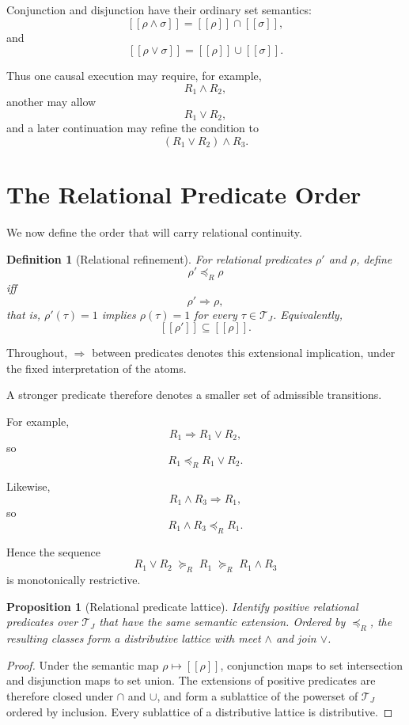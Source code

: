\documentclass[10pt,twocolumn]{article}
\newcommand{\sem}[1]{\left[\!\left[#1\right]\!\right]}
\newcommand{\Transitions}{\mathcal{T}}
\newtheorem{definition}{Definition}
\newtheorem{proposition}{Proposition}
\begin{document}
Conjunction and disjunction have their ordinary set semantics:
\[
\sem{\rho\land\sigma}
=
\sem{\rho}\cap\sem{\sigma},
\]
and
\[
\sem{\rho\lor\sigma}
=
\sem{\rho}\cup\sem{\sigma}.
\]

Thus one causal execution may require, for example,
\[
R_1\land R_2,
\]
another may allow
\[
R_1\lor R_2,
\]
and a later continuation may refine the condition to
\[
(R_1\lor R_2)\land R_3.
\]

\section{The Relational Predicate Order}

We now define the order that will carry relational continuity.

\begin{definition}[Relational refinement]
For relational predicates \(\rho'\) and \(\rho\), define
\[
\rho'\preceq_R\rho
\]
iff
\[
\rho'\Rightarrow\rho,
\]
that is, \(\rho'(\tau)=1\) implies \(\rho(\tau)=1\) for every
\(\tau\in\Transitions_J\). Equivalently,
\[
\sem{\rho'}
\subseteq
\sem{\rho}.
\]
\end{definition}

Throughout, \(\Rightarrow\) between predicates denotes this extensional
implication, under the fixed interpretation of the atoms.

A stronger predicate therefore denotes a smaller set of admissible transitions.

For example,
\[
R_1
\Rightarrow
R_1\lor R_2,
\]
so
\[
R_1
\preceq_R
R_1\lor R_2.
\]

Likewise,
\[
R_1\land R_3
\Rightarrow
R_1,
\]
so
\[
R_1\land R_3
\preceq_R
R_1.
\]

Hence the sequence
\[
R_1\lor R_2
\;\succeq_R\;
R_1
\;\succeq_R\;
R_1\land R_3
\]
is monotonically restrictive.

\begin{proposition}[Relational predicate lattice]\label{prop:lattice}
Identify positive relational predicates over \(\Transitions_J\) that have the
same semantic extension. Ordered by \(\preceq_R\), the resulting classes form a
distributive lattice with meet \(\land\) and join \(\lor\).
\end{proposition}

\begin{proof}
Under the semantic map \(\rho\mapsto\sem{\rho}\), conjunction maps to set
intersection and disjunction maps to set union. The extensions of positive
predicates are therefore closed under \(\cap\) and \(\cup\), and form a
sublattice of the powerset of \(\Transitions_J\) ordered by inclusion. Every
sublattice of a distributive lattice is distributive.
\end{proof}
\end{document}
